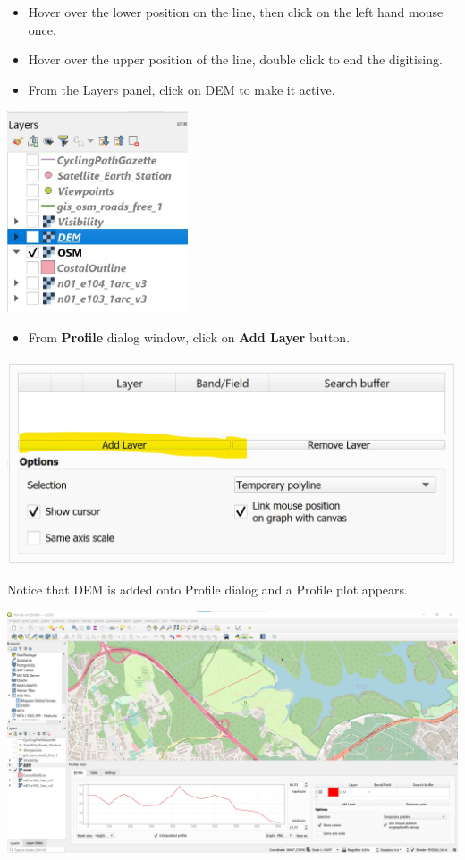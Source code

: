 \documentclass[
  letterpaper,
  DIV=11,
  numbers=noendperiod]{scrreprt}
\providecommand{\tightlist}{%
  \setlength{\itemsep}{0pt}\setlength{\parskip}{0pt}}\usepackage{longtable,booktabs,array}
\begin{document}
\begin{itemize}
\item
  Hover over the lower position on the line, then click on the left hand
  mouse once.
\item
  Hover over the upper position of the line, double click to end the
  digitising.
\item
  From the Layers panel, click on DEM to make it active.
\end{itemize}

\includegraphics[width=2.10417in,height=\textheight]{./img06/image73.jpg}

\begin{itemize}
\tightlist
\item
  From \textbf{Profile} dialog window, click on \textbf{Add Layer}
  button.
\end{itemize}

\includegraphics{./img06/image74.jpg}

Notice that DEM is added onto Profile dialog and a Profile plot appears.

\includegraphics{./img06/image75.jpg}
\end{document}

